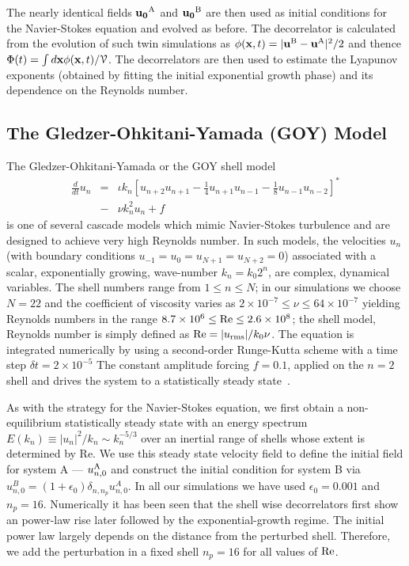 \documentclass[amsmath,amssymb,amsbsy,pre,twocolumn,tightenlines,superscriptaddress,floatfix]{revtex4-2}
\begin{document}
The nearly identical fields  ${\bf u_0}^{\rm A}$ and  ${\bf u_0}^{\rm B}$ are then used as initial conditions for the Navier-Stokes
equation and evolved as before.
The decorrelator is calculated from the evolution of such twin simulations as
$\phi({\bf x},t) = |{\bf u}^{\rm B} - {\bf u}^{\rm A}|^2/2$ and thence $\Phi(t) = \int d{\bf x} \phi({\bf x},t) / \mathcal{V}$.
The decorrelators are then used to estimate the Lyapunov exponents (obtained by fitting the initial exponential growth phase)
and its dependence on the Reynolds number.

\subsection{The Gledzer-Ohkitani-Yamada (GOY) Model}
The Gledzer-Ohkitani-Yamada or the GOY shell model
\begin{eqnarray}
	\frac{d}{dt} u_n &=& \iota k_n [u_{n+2}u_{n+1} - \frac{1}{4}u_{n+1}u_{n-1}
	- \frac{1}{8} u_{n-1}u_{n-2}]^* \nonumber \\ &-& \nu k_n^2 u_n + f
	\label{eq:GOY}
\end{eqnarray}
is one of several cascade models which mimic Navier-Stokes turbulence and are designed to achieve
very high Reynolds number.
In such models, the velocities $u_n$ (with boundary conditions $u_{-1} =
u_{0} = u_{N+1} = u_{N+2} = 0$)  associated with a scalar, exponentially
growing, wave-number $k_n = k_0 2^n$, are complex, dynamical
variables. The shell numbers range from $1 \le n \le N$; in our simulations we
choose $N = 22$ and the coefficient of viscosity varies as $2\times 10^{-7} \le
\nu \le 64 \times 10^{-7}$ yielding Reynolds numbers in the range $ 8.7 \times 10^6
 \le {\rm Re}
\le 2.6 \times 10^8$; the shell model,
Reynolds number is simply defined as ${\rm Re} = |u_{\rm rms}|/k_0\nu$.
The equation is integrated numerically by using a second-order Runge-Kutta scheme with a time step $\delta t = 2 \times 10^{-5}$
The constant amplitude forcing $f = 0.1$, applied on the $n = 2$  shell and drives the system to a statistically steady
state~\cite{Ray2008}.

As with the strategy for the Navier-Stokes equation, we first obtain a non-equilibrium statistically steady
state with  an energy spectrum $E(k_n) \equiv |u_n|^2/k_n \sim k_n^{-5/3}$ over an inertial range
of shells whose extent is determined by Re. We use this steady state velocity field to define the initial
field for system A --- $u_{n,0}^{\rm A}$ and construct the initial condition for system B via
$u^B_{n,0} = (1 + \epsilon_0)
\delta_{n,n_p} u_{n,0}^A$. In all our simulations we have used $\epsilon_0 =
0.001$ and $n_p = 16$.  Numerically it has been seen that the shell wise
decorrelators first show an power-law rise later followed by the
exponential-{growth}
regime. The initial power law largely depends on the
distance from the perturbed shell. Therefore, we add the perturbation in a fixed
shell $n_p = 16$ for all values of ${\rm Re}$.
\end{document}

